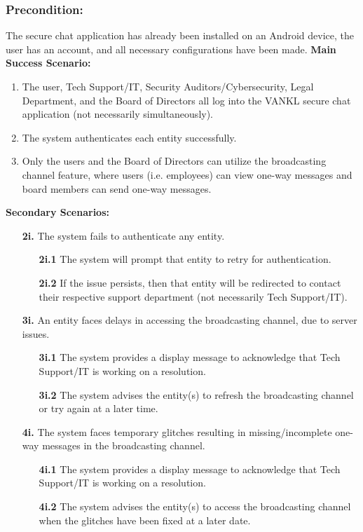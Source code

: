 \documentclass[]{article}
\begin{document}
\subsubsection*{Precondition:} The secure chat application has already been installed on an Android device, the user has an account, and all necessary configurations have been made.\newline\newline
\textbf{Main Success Scenario:}
\begin{enumerate}
	\item The user, Tech Support/IT, Security Auditors/Cybersecurity, Legal Department, and the Board of Directors all log into the VANKL secure chat application (not necessarily simultaneously).
	\item The system authenticates each entity successfully.
	\item Only the users and the Board of Directors can utilize the broadcasting channel feature, where users (i.e. employees) can view one-way messages and board members can send one-way messages.
\end{enumerate}
\textbf{Secondary Scenarios:}
\begin{enumerate}
	\item[\textbf{2i.}] The system fails to authenticate any entity.
		\begin{enumerate}
			\item[\textbf{2i.1}] The system will prompt that entity to retry for authentication.
			\item[\textbf{2i.2}] If the issue persists, then that entity will be redirected to contact their respective support department (not necessarily Tech Support/IT).
		\end{enumerate}
	\item[\textbf{3i.}] An entity faces delays in accessing the broadcasting channel, due to server issues.
		\begin{enumerate}
			\item[\textbf{3i.1}] The system provides a display message to acknowledge that Tech Support/IT is working on a resolution.
			\item[\textbf{3i.2}] The system advises the entity(s) to refresh the broadcasting channel or try again at a later time.
		\end{enumerate}
	\item[\textbf{4i.}] The system faces temporary glitches resulting in missing/incomplete one-way messages in the broadcasting channel.
		\begin{enumerate}
			\item[\textbf{4i.1}] The system provides a display message to acknowledge that Tech Support/IT is working on a resolution.
			\item[\textbf{4i.2}] The system advises the entity(s) to access the broadcasting channel when the glitches have been fixed at a later date.
		\end{enumerate}
\end{enumerate}
\end{document}
